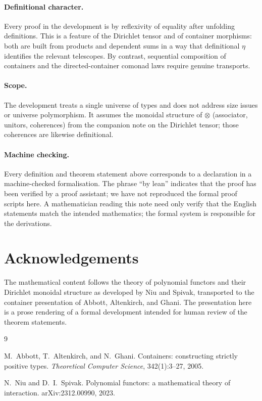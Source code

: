 \documentclass[11pt,a4paper]{article}
\theoremstyle{plain}
\theoremstyle{definition}
\begin{document}
\paragraph{Definitional character.}
Every proof in the development is by reflexivity of equality after unfolding
definitions. This is a feature of the Dirichlet tensor and of container
morphisms: both are built from products and dependent sums in a way that
definitional $\eta$ identifies the relevant telescopes. By contrast,
sequential composition of containers and the directed-container comonad laws
require genuine transports.

\paragraph{Scope.}
The development treats a single universe of types and does not address size
issues or universe polymorphism. It assumes the monoidal structure of
$\otimes$ (associator, unitors, coherences) from the companion note on the
Dirichlet tensor; those coherences are likewise definitional.

\paragraph{Machine checking.}
Every definition and theorem statement above corresponds to a declaration in
a machine-checked formalisation. The phrase ``by lean'' indicates that the
proof has been verified by a proof assistant; we have not reproduced the
formal proof scripts here. A mathematician reading this note need only
verify that the English statements match the intended mathematics; the
formal system is responsible for the derivations.

\section*{Acknowledgements}

The mathematical content follows the theory of polynomial functors and their
Dirichlet monoidal structure as developed by Niu and Spivak, transported to
the container presentation of Abbott, Altenkirch, and Ghani. The presentation
here is a prose rendering of a formal development intended for human review
of the theorem statements.

\begin{thebibliography}{9}

M.~Abbott, T.~Altenkirch, and N.~Ghani.
\newblock Containers: constructing strictly positive types.
\newblock \emph{Theoretical Computer Science}, 342(1):3--27, 2005.

N.~Niu and D.~I.~Spivak.
\newblock Polynomial functors: a mathematical theory of interaction.
\newblock arXiv:2312.00990, 2023.

\end{thebibliography}
\end{document}
